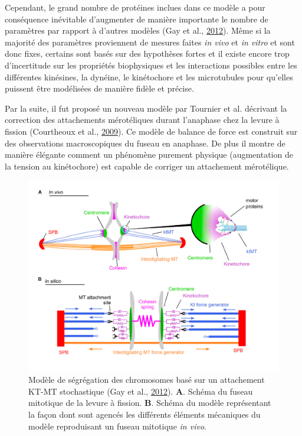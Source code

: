 \documentclass[12pt,a4paper,twoside,openright]{book}
\begin{document}
Cependant, le grand nombre de protéines inclues dans ce modèle a pour
conséquence inévitable d'augmenter de manière importante le nombre de
paramètres par rapport à d'autres modèles (Gay et al.,
\protect\hyperlink{ref-Gay2012a}{2012}). Même si la majorité des
paramètres proviennent de mesures faites \emph{in vivo} et \emph{in
vitro} et sont donc fixes, certains sont basés sur des hypothèses fortes
et il existe encore trop d'incertitude sur les propriétés biophysiques
et les interactions possibles entre les différentes kinésines, la
dynéine, le kinétochore et les microtubules pour qu'elles puissent être
modélisées de manière fidèle et précise.

Par la suite, il fut proposé un nouveau modèle par Tournier et al.
décrivant la correction des attachements mérotéliques durant l'anaphase
chez la levure à fission (Courtheoux et al.,
\protect\hyperlink{ref-Courtheoux2009}{2009}). Ce modèle de balance de
force est construit sur des observations macroscopiques du fuseau en
anaphase. De plus il montre de manière élégante comment un phénomène
purement physique (augmentation de la tension au kinétochore) est
capable de corriger un attachement mérotélique.

\begin{figure}[htbp]
\centering
\includegraphics{figures/intro/gay.png}
\caption{\label{fig:gay}Modèle de ségrégation des chromosomes basé sur
un attachement KT-MT stochastique (Gay et al.,
\protect\hyperlink{ref-Gay2012a}{2012}). \textbf{A}. Schéma du fuseau
mitotique de la levure à fission. \textbf{B}. Schéma du modèle
représentant la façon dont sont agencés les différents éléments
mécaniques du modèle reproduisant un fuseau mitotique \emph{in vivo}.}
\end{figure}
\end{document}
